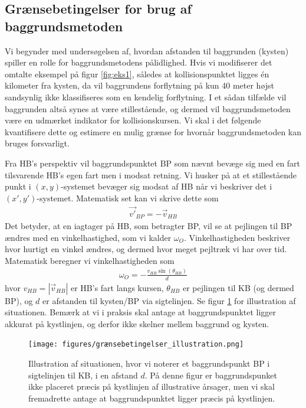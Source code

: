 \documentclass[%
 reprint,
nofootinbib,
aps,
]{revtex4-1}
\begin{document}
\subsection{Grænsebetingelser for brug af baggrundsmetoden}
Vi begynder med undersøgelsen af, hvordan afstanden til baggrunden (kysten) spiller en rolle for baggrundsmetodens pålidlighed. Hvis vi modifiserer det omtalte eksempel på figur \ref{fig:eks1}, således at kollisionspunktet ligges én kilometer fra kysten, da vil baggrundens forflytning på kun 40 meter højst sandsynlig ikke klassifiseres som en kendelig forflytning. I et sådan tilfælde vil baggrunden altså synes at være stillestående, og dermed vil baggrundsmetoden være en udmærket indikator for kollisionskursen. Vi skal i det følgende kvantifisere dette og estimere en mulig grænse for hvornår baggrundsmetoden kan bruges forsvarligt. \par
Fra HB's perspektiv vil baggrundspunktet BP som nævnt bevæge sig med en fart tilsvarende HB's egen fart men i modsat retning. Vi husker på at et stillestående punkt i $(x,y)$-systemet bevæger sig modsat af HB når vi beskriver det i $(x',y')$-systemet. Matematisk set kan vi skrive dette som
\begin{align*}
  \vec{v'}_{BP} = - \vec{v}_{HB}
\end{align*}
Det betyder, at en iagtager på HB, som betragter BP, vil se at pejlingen til BP ændres med en vinkelhastighed, som vi kalder $\omega_O$. Vinkelhastigheden beskriver hvor hurtigt en vinkel ændres, og dermed hvor meget pejltræk vi har over tid. Matematisk beregner vi vinkelhastigheden som
\begin{align*}
 \omega_O = -\frac{v_{HB}\sin{(\theta_{HB})}}{d}
\end{align*}
hvor $v_{HB} = |\vec{v}_{HB}|$ er HB's fart langs kursen, $\theta_{HB}$ er pejlingen til KB (og dermed BP), og $d$ er afstanden til kysten/BP via sigtelinjen. Se figur \ref{fig:grænsebetingelser_illustration} for illustration af situationen. Bemærk at vi i praksis skal antage at baggrundspunktet ligger akkurat på kystlinjen, og derfor ikke skelner mellem baggrund og kysten.

\begin{figure}[H]
  \texttt{[image: figures/grænsebetingelser\_illustration.png]}
  \caption{Illustration af situationen, hvor vi noterer et baggrundspunkt BP i sigtelinjen til KB, i en afstand $d$. På denne figur er baggrundspunket ikke placeret præcis på kystlinjen af illustrative årsager, men vi skal fremadrette antage at baggrundspunktet ligger præcis på kystlinjen.}
  \label{fig:grænsebetingelser_illustration}
\end{figure}
\end{document}
